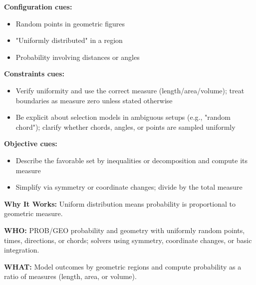 \documentclass[12pt]{article}
\begin{document}
\textbf{Configuration cues:}
\begin{itemize}
    \item Random points in geometric figures
    \item "Uniformly distributed" in a region
    \item Probability involving distances or angles
\end{itemize}

\textbf{Constraints cues:}
\begin{itemize}
    \item Verify uniformity and use the correct measure (length/area/volume); treat boundaries as measure zero unless stated otherwise
    \item Be explicit about selection models in ambiguous setups (e.g., "random chord"); clarify whether chords, angles, or points are sampled uniformly
\end{itemize}

\textbf{Objective cues:}
\begin{itemize}
    \item Describe the favorable set by inequalities or decomposition and compute its measure
    \item Simplify via symmetry or coordinate changes; divide by the total measure
\end{itemize}

\textbf{Why It Works:} Uniform distribution means probability is proportional to geometric measure.

\textbf{WHO:} PROB/GEO probability and geometry with uniformly random points, times, directions, or chords; solvers using symmetry, coordinate changes, or basic integration.

\textbf{WHAT:} Model outcomes by geometric regions and compute probability as a ratio of measures (length, area, or volume).
\end{document}
